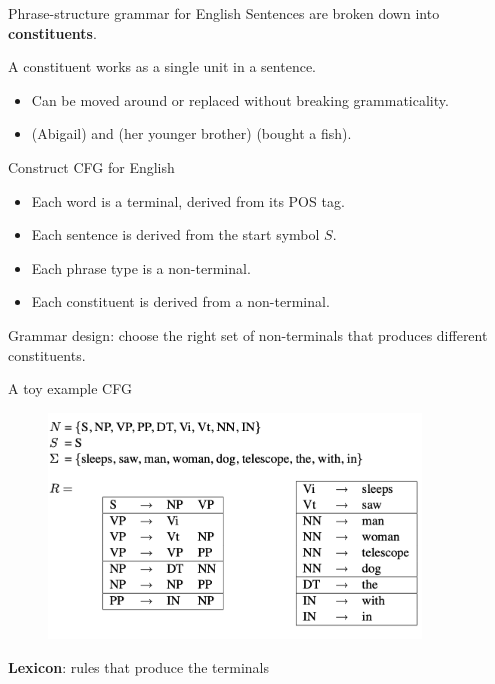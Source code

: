 \documentclass[usenames,dvipsnames,notes]{beamer}
\begin{document}
\begin{frame}
    {Phrase-structure grammar for English}
    Sentences are broken down into \textbf{constituents}.

    A constituent works as a single unit in a sentence.\\
    \begin{itemize}
        \item Can be moved around or replaced without breaking grammaticality.
        \item[] (Abigail) and (her younger brother) (bought a fish).
    \end{itemize}

    Construct CFG for English\\
    \begin{itemize}
        \item Each word is a terminal, derived from its POS tag.
        \item Each sentence is derived from the start symbol $S$.
        \item Each phrase type is a non-terminal.
        \item Each constituent is derived from a non-terminal.
    \end{itemize}

    Grammar design: choose the right set of non-terminals that produces different constituents.
\end{frame}

\begin{frame}
    {A toy example CFG}
    \begin{figure}    
        \includegraphics[height=6cm]{figures/toy-cfg.png}
    \end{figure}   
    \vspace{-2em}
    \textbf{Lexicon}: rules that produce the terminals
\end{frame}
\end{document}
